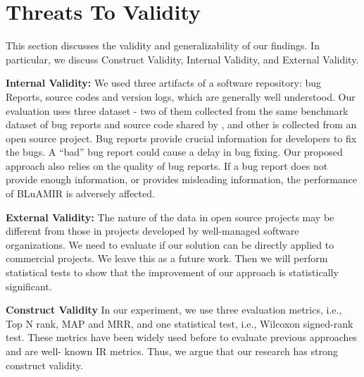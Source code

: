 \documentclass[conference]{IEEEtran}
\begin{document}


\section{Threats To Validity}\label{sec:threats}
This section discusses the validity and generalizability of our findings. In particular, we discuss Construct Validity, Internal Validity, and External Validity.

\textbf{Internal Validity:} We used three artifacts of a software repository: bug Reports, source codes and version logs, which are generally well understood. Our evaluation uses three dataset - two of them collected from the same benchmark dataset of bug reports and source code shared by \citet{Jian}, and other is collected from an open source project. Bug reports provide crucial information for developers to fix the bugs. A “bad” bug report could cause a delay in bug fixing. Our proposed approach also relies on the quality of bug reports. If a bug report does not provide enough information, or provides misleading information, the performance of BLuAMIR is adversely affected.

\textbf{External Validity:} 
The nature of the data in open source projects may be different from those in projects developed by well-managed software organizations. We need to evaluate if our solution can be directly applied to commercial projects. We leave this as a future work. Then we will perform statistical tests to show that the improvement of our approach is statistically significant.

\textbf{Construct Validity}
In our experiment, we use three evaluation metrics, i.e., Top N rank, MAP and
MRR, and one statistical test, i.e., Wilcoxon signed-rank test. These metrics have been widely used before to evaluate previous approaches \cite{Jian, Saha} and are well- known IR metrics. Thus, we argue that our research has strong construct validity.
\end{document}
